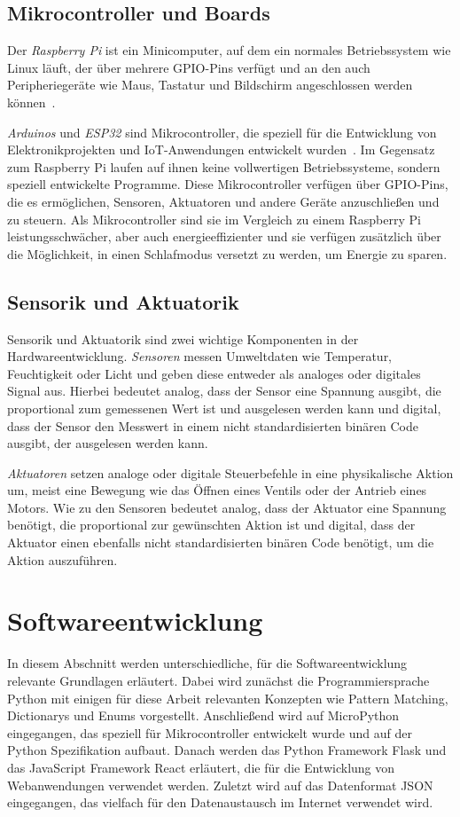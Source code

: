 \subsection*{Mikrocontroller und Boards}
Der \emph{Raspberry Pi} ist ein Minicomputer, auf dem ein normales Betriebssystem wie Linux läuft, der über mehrere GPIO-Pins verfügt und an den auch Peripheriegeräte wie Maus, Tastatur und Bildschirm angeschlossen werden können~\cite{RaspberryPi}.

\emph{Arduinos} und \emph{ESP32} sind Mikrocontroller, die speziell für die Entwicklung von Elektronikprojekten und IoT-Anwendungen entwickelt wurden~\cite{Arduino, ESP32}.
Im Gegensatz zum Raspberry Pi laufen auf ihnen keine vollwertigen Betriebssysteme, sondern speziell entwickelte Programme.
Diese Mikrocontroller verfügen über GPIO-Pins, die es ermöglichen, Sensoren, Aktuatoren und andere Geräte anzuschließen und zu steuern.
Als Mikrocontroller sind sie im Vergleich zu einem Raspberry Pi leistungsschwächer, aber auch energieeffizienter und sie verfügen zusätzlich über die Möglichkeit, in einen Schlafmodus versetzt zu werden, um Energie zu sparen.


\subsection*{Sensorik und Aktuatorik}
Sensorik und Aktuatorik sind zwei wichtige Komponenten in der Hardwareentwicklung.
\emph{Sensoren} messen Umweltdaten wie Temperatur, Feuchtigkeit oder Licht und geben diese entweder als analoges oder digitales Signal aus.
Hierbei bedeutet analog, dass der Sensor eine Spannung ausgibt, die proportional zum gemessenen Wert ist und ausgelesen werden kann und digital, dass der Sensor den Messwert in einem nicht standardisierten binären Code ausgibt, der ausgelesen werden kann.

\emph{Aktuatoren} setzen analoge oder digitale Steuerbefehle in eine physikalische Aktion um, meist eine Bewegung wie das Öffnen eines Ventils oder der Antrieb eines Motors.
Wie zu den Sensoren bedeutet analog, dass der Aktuator eine Spannung benötigt, die proportional zur gewünschten Aktion ist und digital, dass der Aktuator einen ebenfalls nicht standardisierten binären Code benötigt, um die Aktion auszuführen.


\section{Softwareentwicklung}
In diesem Abschnitt werden unterschiedliche, für die Softwareentwicklung relevante Grundlagen erläutert.
Dabei wird zunächst die Programmiersprache Python mit einigen für diese Arbeit relevanten Konzepten wie Pattern Matching, Dictionarys und Enums vorgestellt.
Anschließend wird auf MicroPython eingegangen, das speziell für Mikrocontroller entwickelt wurde und auf der Python Spezifikation aufbaut.
Danach werden das Python Framework Flask und das JavaScript Framework React erläutert, die für die Entwicklung von Webanwendungen verwendet werden.
Zuletzt wird auf das Datenformat JSON eingegangen, das vielfach für den Datenaustausch im Internet verwendet wird.


